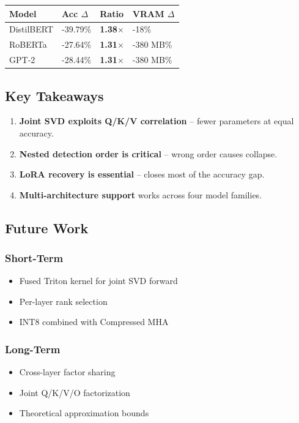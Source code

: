 \begin{table}[H]
\centering
\small
\begin{tabular}{llll}
\toprule
\textbf{Model} & \textbf{Acc $\Delta$} & \textbf{Ratio} & \textbf{VRAM $\Delta$} \\
\midrule
DistilBERT & -39.79\% & \textbf{1.38$\times$} & -18\% \\
RoBERTa & -27.64\% & \textbf{1.31$\times$} & -380 MB\% \\
GPT-2 & -28.44\% & \textbf{1.31$\times$} & -380 MB\% \\
\bottomrule
\end{tabular}
\end{table}

\subsection{Key Takeaways}

\begin{enumerate}
\item \textbf{Joint SVD exploits Q/K/V correlation} -- fewer parameters at equal
  accuracy.
\item \textbf{Nested detection order is critical} -- wrong order causes collapse.
\item \textbf{LoRA recovery is essential} -- closes most of the accuracy gap.
\item \textbf{Multi-architecture support} works across four model families.

\end{enumerate}
\subsection{Future Work}

\subsubsection{Short-Term}
\begin{itemize}
\item Fused Triton kernel for joint SVD forward
\item Per-layer rank selection
\item INT8 combined with Compressed MHA

\end{itemize}
\subsubsection{Long-Term}
\begin{itemize}
\item Cross-layer factor sharing
\item Joint Q/K/V/O factorization
\item Theoretical approximation bounds

\end{itemize}
